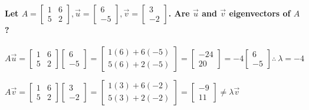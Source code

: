 \documentclass[
  letterpaper,
  DIV=11,
  numbers=noendperiod]{scrartcl}
\let\oldparagraph\paragraph
\renewcommand{\paragraph}[1]{\oldparagraph{#1}\mbox{}}
\begin{document}
\hypertarget{let-a-beginbmatrix-1-6-5-2endbmatrix-vecu-beginbmatrix-6--5endbmatrix-vecv-beginbmatrix3--2-endbmatrix.-are-vecu-and-vecv-eigenvectors-of-a}{%
\paragraph{\texorpdfstring{Let
\(A = \begin{bmatrix} 1 & 6 \\ 5 & 2\end{bmatrix}, \vec{u} = \begin{bmatrix} 6 \\ -5\end{bmatrix}, \vec{v} = \begin{bmatrix}3 \\ -2 \end{bmatrix}\).
Are \(\vec{u}\) and \(\vec{v}\) eigenvectors of
\(A\)?}{Let A = \textbackslash begin\{bmatrix\} 1 \& 6 \textbackslash\textbackslash{} 5 \& 2\textbackslash end\{bmatrix\}, \textbackslash vec\{u\} = \textbackslash begin\{bmatrix\} 6 \textbackslash\textbackslash{} -5\textbackslash end\{bmatrix\}, \textbackslash vec\{v\} = \textbackslash begin\{bmatrix\}3 \textbackslash\textbackslash{} -2 \textbackslash end\{bmatrix\}. Are \textbackslash vec\{u\} and \textbackslash vec\{v\} eigenvectors of A?}}\label{let-a-beginbmatrix-1-6-5-2endbmatrix-vecu-beginbmatrix-6--5endbmatrix-vecv-beginbmatrix3--2-endbmatrix.-are-vecu-and-vecv-eigenvectors-of-a}}

\(A\vec{u} = \begin{bmatrix} 1 & 6 \\ 5 & 2\end{bmatrix}\begin{bmatrix} 6 \\ -5\end{bmatrix} = \begin{bmatrix} 1(6)+6(-5) \\ 5(6)+2(-5)\end{bmatrix} = \begin{bmatrix} -24 \\ 20\end{bmatrix} = -4\begin{bmatrix}6 \\ -5\end{bmatrix} \therefore \ \lambda = -4\)

\(A\vec{v} = \begin{bmatrix} 1 & 6 \\ 5 & 2\end{bmatrix}\begin{bmatrix} 3 \\ -2\end{bmatrix} = \begin{bmatrix} 1(3)+6(-2) \\ 5(3)+2(-2)\end{bmatrix} = \begin{bmatrix} -9 \\ 11\end{bmatrix} \neq \lambda\vec{v}\)
\end{document}
